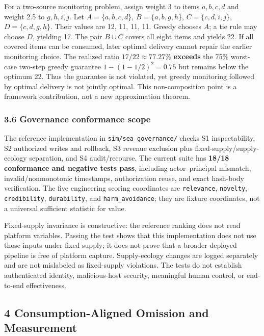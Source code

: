 \documentclass[
  11pt]{article}
\begin{document}
For a two-source monitoring problem, assign weight 3 to items
\(a,b,c,d\) and weight 2.5 to \(g,h,i,j\). Let \(A=\{a,b,c,d\}\),
\(B=\{a,b,g,h\}\), \(C=\{c,d,i,j\}\), \(D=\{c,d,g,h\}\). Their values
are 12, 11, 11, 11. Greedy chooses \(A\); a tie rule may choose \(D\),
yielding 17. The pair \(B\cup C\) covers all eight items and yields 22.
If all covered items can be consumed, later optimal delivery cannot
repair the earlier monitoring choice. The realized ratio
\(17/22\approx77.27\%\) \textbf{exceeds} the 75\% worst-case two-step
greedy guarantee \(1-(1-1/2)^2=0.75\) but remains below the optimum 22.
Thus the guarantee is not violated, yet greedy monitoring followed by
optimal delivery is not jointly optimal. This non-composition point is a
framework contribution, not a new approximation theorem.

\subsubsection{3.6 Governance conformance
scope}\label{governance-conformance-scope}

The reference implementation in \texttt{sim/sea\_governance/} checks S1
inspectability, S2 authorized writes and rollback, S3 revenue exclusion
plus fixed-supply/supply-ecology separation, and S4 audit/recourse. The
current suite has \textbf{18/18 conformance and negative tests pass},
including actor--principal mismatch, invalid/nonmonotonic timestamps,
authorization reuse, and exact hash-body verification. The five
engineering scoring coordinates are \texttt{relevance},
\texttt{novelty}, \texttt{credibility}, \texttt{durability}, and
\texttt{harm\_avoidance}; they are fixture coordinates, not a universal
sufficient statistic for value.

Fixed-supply invariance is constructive: the reference ranking does not
read platform variables. Passing the test shows that this implementation
does not use those inputs under fixed supply; it does not prove that a
broader deployed pipeline is free of platform capture. Supply-ecology
changes are logged separately and are not mislabeled as fixed-supply
violations. The tests do not establish authenticated identity,
malicious-host security, meaningful human control, or end-to-end
effectiveness.

\subsection{4 Consumption-Aligned Omission and
Measurement}\label{consumption-aligned-omission-and-measurement}
\end{document}
